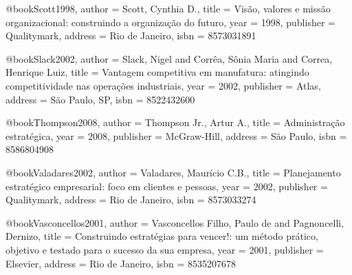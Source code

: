@book{Scott1998,
  author = {Scott, Cynthia D.},
  title = {Visão, valores e missão organizacional: construindo a organização do futuro},
  year = {1998},
  publisher = {Qualitymark},
  address = {Rio de Janeiro},
  isbn = {8573031891}
}

@book{Slack2002,
  author = {Slack, Nigel and Corrêa, Sônia Maria and Correa, Henrique Luiz},
  title = {Vantagem competitiva em manufatura: atingindo competitividade nas operações industriais},
  year = {2002},
  publisher = {Atlas},
  address = {São Paulo, SP},
  isbn = {8522432600}
}

@book{Thompson2008,
  author = {Thompson Jr., Artur A.},
  title = {Administração estratégica},
  year = {2008},
  publisher = {McGraw-Hill},
  address = {São Paulo},
  isbn = {8586804908}
}

@book{Valadares2002,
  author = {Valadares, Maurício C.B.},
  title = {Planejamento estratégico empresarial: foco em clientes e pessoas},
  year = {2002},
  publisher = {Qualitymark},
  address = {Rio de Janeiro},
  isbn = {8573033274}
}

@book{Vasconcellos2001,
  author = {Vasconcellos Filho, Paulo de and Pagnoncelli, Dernizo},
  title = {Construindo estratégias para vencer!: um método prático, objetivo e testado para o sucesso da sua empresa},
  year = {2001},
  publisher = {Elsevier},
  address = {Rio de Janeiro},
  isbn = {8535207678}
}

%

%

